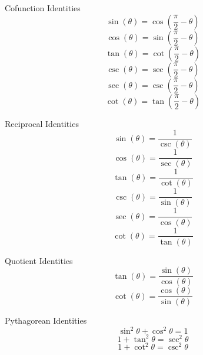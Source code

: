 \documentclass[12pt]{article}
\numberwithin{equation}{subsection}
\newcommand{\sinp}[1]{\sin\left( #1 \right)}
\newcommand{\cosp}[1]{\cos\left( #1 \right)}
\newcommand{\tanp}[1]{\tan\left( #1 \right)}
\newcommand{\secp}[1]{\sec\left( #1 \right)}
\newcommand{\cscp}[1]{\csc\left( #1 \right)}
\newcommand{\cotp}[1]{\cot\left( #1 \right)}
\begin{document}
\begin{flushleft}
Cofunction Identities
\begin{equation}
\sinp{\theta}=\cosp{\frac{\pi}{2}-\theta}
\end{equation}
\begin{equation}
\cosp{\theta}=\sinp{\frac{\pi}{2}-\theta}
\end{equation}
\begin{equation}
\tanp{\theta}=\cotp{\frac{\pi}{2}-\theta}
\end{equation}
\begin{equation}
\cscp{\theta}=\secp{\frac{\pi}{2}-\theta}
\end{equation}
\begin{equation}
\secp{\theta}=\cscp{\frac{\pi}{2}-\theta}
\end{equation}
\begin{equation}
\cotp{\theta}=\tanp{\frac{\pi}{2}-\theta}
\end{equation}

Reciprocal Identities
\begin{equation}
\sinp{\theta}=\frac{1}{\cscp{\theta}}
\end{equation}
\begin{equation}
\cosp{\theta}=\frac{1}{\secp{\theta}}
\end{equation}
\begin{equation}
\tanp{\theta}=\frac{1}{\cotp{\theta}}
\end{equation}
\begin{equation}
\cscp{\theta}=\frac{1}{\sinp{\theta}}
\end{equation}
\begin{equation}
\secp{\theta}=\frac{1}{\cosp{\theta}}
\end{equation}
\begin{equation}
\cotp{\theta}=\frac{1}{\tanp{\theta}}
\end{equation}

Quotient Identities
\begin{equation}
\tanp{\theta}=\frac{\sinp{\theta}}{\cosp{\theta}}
\end{equation}
\begin{equation}
\cotp{\theta}=\frac{\cosp{\theta}}{\sinp{\theta}}
\end{equation}

Pythagorean Identities
\begin{equation}
\sin^{2}{\theta}+\cos^2{\theta}=1
\end{equation}
\begin{equation}
1+\tan^2{\theta}=\sec^2{\theta}
\end{equation}
\begin{equation}
1+\cot^2{\theta}=\csc^2{\theta}
\end{equation}
\end{flushleft}
\end{document}

